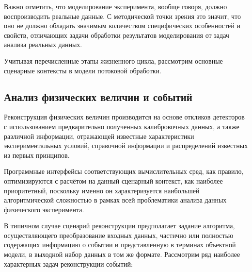 Важно отметить, что моделирование эксперимента, вообще говоря, должно воспроизводить
реальные данные. С методической точки зрения это значит, что оно
не должно обладать значимым количеством специфических
особенностей и свойств, отличающих задачи обработки результатов
моделирования от задач анализа реальных данных.

Учитывая перечисленные этапы жизненного цикла, рассмотрим основные
сценарные контексты в модели потоковой обработки.

\subsection{Анализ физических величин и событий}

Реконструкция физических величин производится на основе откликов детекторов
с использованием предварительно полученных калибровочных
данных, а также различной информации, отражающей известные
характеристики экспериментальных условий, справочной информации и
распределений известных из первых принципов.

Программные интерфейсы соответствующих вычислительных сред, как
правило, оптимизируются с расчётом на данный сценарный контекст, как
наиболее приоритетный, поскольку именно он характеризуется наибольшей
алгоритмической сложностью в рамках всей проблематики анализа данных
физического эксперимента.

В типичном случае сценарий реконструкции предполагает задание
алгоритма, осуществляющего преобразование входных данных, частично
или полностью содержащих информацию о событии и представленную в
терминах объектной модели, в выходной набор данных в том же формате.
Рассмотрим ряд наиболее характерных задач реконструкции событий:

